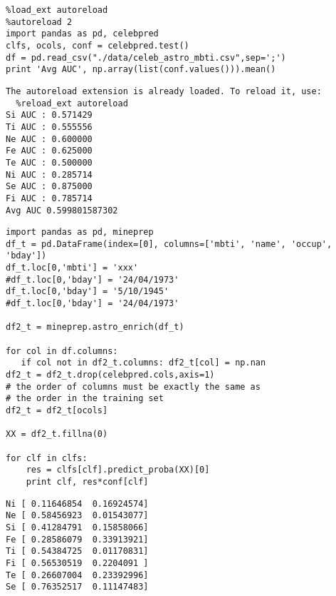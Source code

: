 \documentclass[12pt,fleqn]{article}\usepackage{../common}
\begin{document}
\begin{verbatim}
%load_ext autoreload
%autoreload 2
import pandas as pd, celebpred
clfs, ocols, conf = celebpred.test()
df = pd.read_csv("./data/celeb_astro_mbti.csv",sep=';')
print 'Avg AUC', np.array(list(conf.values())).mean()
\end{verbatim}

\begin{verbatim}
The autoreload extension is already loaded. To reload it, use:
  %reload_ext autoreload
Si AUC : 0.571429
Ti AUC : 0.555556
Ne AUC : 0.600000
Fe AUC : 0.625000
Te AUC : 0.500000
Ni AUC : 0.285714
Se AUC : 0.875000
Fi AUC : 0.785714
Avg AUC 0.599801587302
\end{verbatim}


\begin{verbatim}
import pandas as pd, mineprep
df_t = pd.DataFrame(index=[0], columns=['mbti', 'name', 'occup', 'bday'])
df_t.loc[0,'mbti'] = 'xxx'
#df_t.loc[0,'bday'] = '24/04/1973'
df_t.loc[0,'bday'] = '5/10/1945'
#df_t.loc[0,'bday'] = '24/04/1973'

df2_t = mineprep.astro_enrich(df_t)

for col in df.columns: 
   if col not in df2_t.columns: df2_t[col] = np.nan
df2_t = df2_t.drop(celebpred.cols,axis=1)
# the order of columns must be exactly the same as 
# the order in the training set
df2_t = df2_t[ocols] 

XX = df2_t.fillna(0)

for clf in clfs: 
    res = clfs[clf].predict_proba(XX)[0]
    print clf, res*conf[clf]
\end{verbatim}

\begin{verbatim}
Ni [ 0.11646854  0.16924574]
Ne [ 0.58456923  0.01543077]
Si [ 0.41284791  0.15858066]
Fe [ 0.28586079  0.33913921]
Ti [ 0.54384725  0.01170831]
Fi [ 0.56530519  0.2204091 ]
Te [ 0.26607004  0.23392996]
Se [ 0.76352517  0.11147483]
\end{verbatim}
\end{document}

